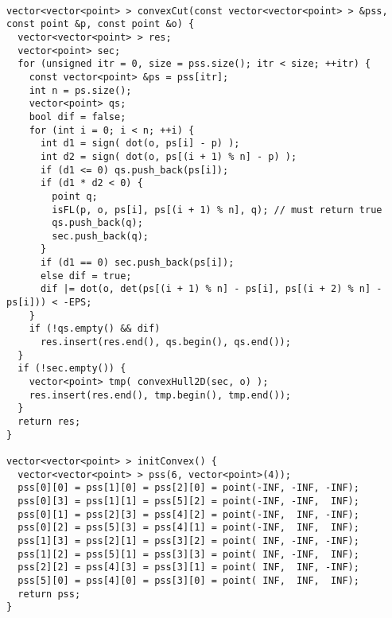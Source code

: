\begin{lstlisting}

vector<vector<point> > convexCut(const vector<vector<point> > &pss, const point &p, const point &o) {
  vector<vector<point> > res;
  vector<point> sec;
  for (unsigned itr = 0, size = pss.size(); itr < size; ++itr) {
    const vector<point> &ps = pss[itr];
    int n = ps.size();
    vector<point> qs;
    bool dif = false;
    for (int i = 0; i < n; ++i) {
      int d1 = sign( dot(o, ps[i] - p) );
      int d2 = sign( dot(o, ps[(i + 1) % n] - p) );
      if (d1 <= 0) qs.push_back(ps[i]);
      if (d1 * d2 < 0) {
        point q;
        isFL(p, o, ps[i], ps[(i + 1) % n], q); // must return true
        qs.push_back(q);
        sec.push_back(q);
      }
      if (d1 == 0) sec.push_back(ps[i]);
      else dif = true;
      dif |= dot(o, det(ps[(i + 1) % n] - ps[i], ps[(i + 2) % n] - ps[i])) < -EPS;
    }
    if (!qs.empty() && dif)
      res.insert(res.end(), qs.begin(), qs.end());
  }
  if (!sec.empty()) {
    vector<point> tmp( convexHull2D(sec, o) );
    res.insert(res.end(), tmp.begin(), tmp.end());
  }
  return res;
}

vector<vector<point> > initConvex() {
  vector<vector<point> > pss(6, vector<point>(4));
  pss[0][0] = pss[1][0] = pss[2][0] = point(-INF, -INF, -INF);
  pss[0][3] = pss[1][1] = pss[5][2] = point(-INF, -INF,  INF);
  pss[0][1] = pss[2][3] = pss[4][2] = point(-INF,  INF, -INF);
  pss[0][2] = pss[5][3] = pss[4][1] = point(-INF,  INF,  INF);
  pss[1][3] = pss[2][1] = pss[3][2] = point( INF, -INF, -INF);
  pss[1][2] = pss[5][1] = pss[3][3] = point( INF, -INF,  INF);
  pss[2][2] = pss[4][3] = pss[3][1] = point( INF,  INF, -INF);
  pss[5][0] = pss[4][0] = pss[3][0] = point( INF,  INF,  INF);
  return pss;
}

\end{lstlisting}